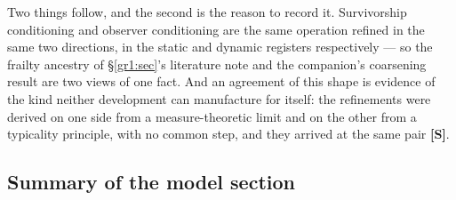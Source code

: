 \documentclass[11pt]{article}
\numberwithin{equation}{section}
\theoremstyle{plain}
\theoremstyle{definition}
\theoremstyle{remark}
\begin{document}
Two things follow, and the second is the reason to record it.
Survivorship conditioning and observer conditioning are the same
operation refined in the same two directions, in the static and
dynamic registers respectively --- so the frailty ancestry of
\S\ref{gr1:sec}'s literature note and the companion's coarsening
result are two views of one fact. And an agreement of this shape is
evidence of the kind neither development can manufacture for itself:
the refinements were derived on one side from a measure-theoretic
limit and on the other from a typicality principle, with no common
step, and they arrived at the same pair \textbf{[S]}.

\subsection{Summary of the model section}\label{gr1:sub:summary}
\end{document}
